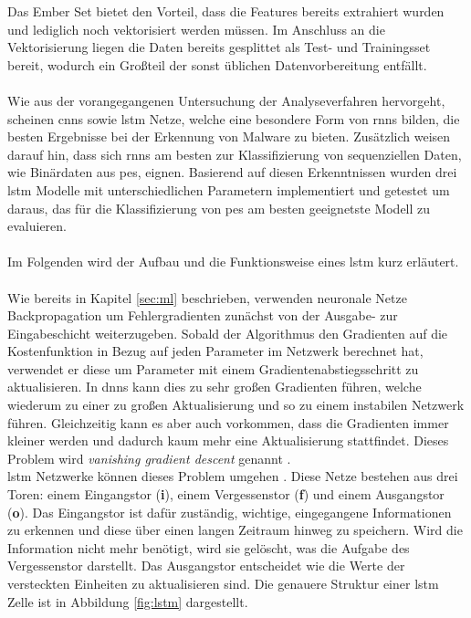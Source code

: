 \documentclass[
    12pt, %
    DIV10,
    ngerman, %
    a4paper, %
    oneside, %
    titlepage, %
    parskip=half, %
    headings=normal, %
    listof=totoc, %
    bibliography=totoc, %
    index=totoc, %
    captions=tableheading, %
    final %
]{scrreprt}
\begin{document}
Das Ember Set bietet den Vorteil, dass die Features bereits extrahiert wurden und lediglich noch vektorisiert werden müssen. Im Anschluss an die Vektorisierung liegen die Daten bereits gesplittet als Test- und Trainingsset bereit, wodurch ein Gro{\ss}teil der sonst üblichen Datenvorbereitung entfällt.\\\\
Wie aus der vorangegangenen Untersuchung der Analyseverfahren hervorgeht, scheinen \ac{cnns} sowie \ac{lstm} Netze, welche eine besondere Form von \ac{rnns} bilden, die besten Ergebnisse bei der Erkennung von Malware zu bieten. Zusätzlich weisen \textcite{JoshuaSaxe2018} darauf hin, dass sich \ac{rnns} am besten zur Klassifizierung von sequenziellen Daten, wie Binärdaten aus \ac{pes}, eignen. Basierend auf diesen Erkenntnissen wurden drei \ac{lstm} Modelle mit unterschiedlichen Parametern implementiert und getestet um daraus, das für die Klassifizierung von \ac{pes} am besten geeignetste Modell zu evaluieren.\\\\
Im Folgenden wird der Aufbau und die Funktionsweise eines \ac{lstm} kurz erläutert.\\\\
Wie bereits in Kapitel \ref{sec:ml} beschrieben, verwenden neuronale Netze Backpropagation um Fehlergradienten zunächst von der Ausgabe- zur Eingabeschicht weiterzugeben. Sobald der Algorithmus den Gradienten auf die Kostenfunktion in Bezug auf jeden Parameter im Netzwerk berechnet hat, verwendet er diese um Parameter mit einem Gradientenabstiegsschritt zu aktualisieren. In \ac{dnns} kann dies zu sehr gro{\ss}en Gradienten führen, welche wiederum zu einer zu gro{\ss}en Aktualisierung und so zu einem instabilen Netzwerk führen. Gleichzeitig kann es aber auch vorkommen, dass die Gradienten immer kleiner werden und dadurch kaum mehr eine Aktualisierung stattfindet. Dieses Problem wird \emph{vanishing gradient descent} genannt \parencite{geron2019hands}.\\
\ac{lstm} Netzwerke können dieses Problem umgehen \parencite{hochreiter1997long}. Diese Netze bestehen aus drei Toren: einem Eingangstor (\textbf{i}), einem Vergessenstor (\textbf{f}) und einem Ausgangstor (\textbf{o}). Das Eingangstor ist dafür zuständig, wichtige, eingegangene Informationen zu erkennen und diese über einen langen Zeitraum hinweg zu speichern. Wird die Information nicht mehr benötigt, wird sie gelöscht, was die Aufgabe des Vergessenstor darstellt. Das Ausgangstor entscheidet wie die Werte der versteckten Einheiten zu aktualisieren sind. Die genauere Struktur einer \ac{lstm} Zelle ist in Abbildung \ref{fig:lstm} dargestellt.
\end{document}
